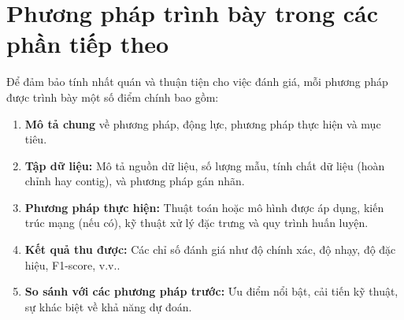 \section{Phương pháp trình bày trong các phần tiếp theo}

Để đảm bảo tính nhất quán và thuận tiện cho việc đánh giá, mỗi phương pháp được trình bày một số điểm chính bao gồm:

\begin{enumerate}
    \item \textbf{Mô tả chung} về phương pháp, động lực, phương pháp thực hiện và mục tiêu.
    \item \textbf{Tập dữ liệu:} Mô tả nguồn dữ liệu, số lượng mẫu, tính chất dữ liệu (hoàn chỉnh hay contig), và phương pháp gán nhãn.
    \item \textbf{Phương pháp thực hiện:} Thuật toán hoặc mô hình được áp dụng, kiến trúc mạng (nếu có), kỹ thuật xử lý đặc trưng và quy trình huấn luyện.
    \item \textbf{Kết quả thu được:} Các chỉ số đánh giá như độ chính xác, độ nhạy, độ đặc hiệu, F1-score, v.v..
    \item \textbf{So sánh với các phương pháp trước:} Ưu điểm nổi bật, cải tiến kỹ thuật, sự khác biệt về khả năng dự đoán.
\end{enumerate}
